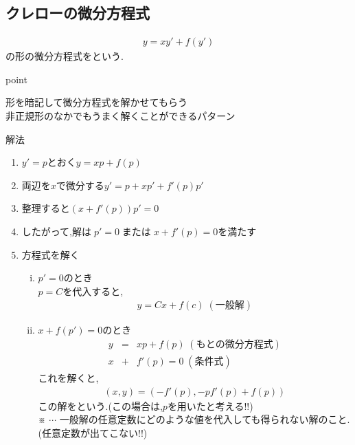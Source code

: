 \documentclass[a4paper]{jsarticle}
\begin{document}
\subsection{クレローの微分方程式}
\begin{eqnarray*}
    y=xy'+f\left(y'\right)
\end{eqnarray*}
の形の微分方程式をという.\\
\begin{itembox}[l]{point}
    \begin{center}
        形を暗記して微分方程式を解かせてもらう\\
        非正規形のなかでもうまく解くことができるパターン
    \end{center}
\end{itembox}
\begin{itembox}[l]{解法}
    \begin{enumerate}[(1)]
        \item$y'=p$とおく\quad$y=xp+f\left(p\right)$
        \item 両辺を$x$で微分する\quad$y'=p+xp'+f'\left(p\right)p'$
        \item 整理すると\quad$\left(x+f'\left(p\right)\right)p'=0$
        \item したがって,解は$\;p'=0\;$または$\; x+f'\left(p\right)=0$を満たす
        \item 方程式を解く
              \begin{enumerate}[(i)]
                  \item $p'=0$のとき\\
                        $p=C$を代入すると,
                        \begin{eqnarray*}
                            y=Cx+f\left(c\right)\;(一般解)
                        \end{eqnarray*}
                  \item $x+f\left(p'\right)=0$のとき
                        \begin{eqnarray*}
                            y&=&xp+f\left(p\right)\; (もとの微分方程式)\\
                            x&+&f'\left(p\right)=0\; (条件式)
                        \end{eqnarray*}
                        これを解くと,
                        \begin{eqnarray*}
                            \left(x,y\right)=\left(-f'\left(p\right),-pf'\left(p\right)+f\left(p\right)\right)
                        \end{eqnarray*}
                        この解をという.(この場合は,$p$を用いたと考える!!)\\
                        ※ $\cdots$ 一般解の任意定数にどのような値を代入しても得られない解のこと.\\
                        \quad(任意定数が出てこない!!)
              \end{enumerate}
    \end{enumerate}
\end{itembox}
\end{document}
